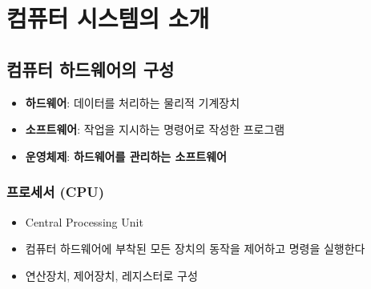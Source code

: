 \section{컴퓨터 시스템의 소개}
\subsection{컴퓨터 하드웨어의 구성}
\begin{itemize}
	\item \textbf{하드웨어}: 데이터를 처리하는 물리적 기계장치
	\item \textbf{소프트웨어}: 작업을 지시하는 명령어로 작성한 프로그램
	\item \textbf{운영체제}: \textbf{하드웨어를 관리하는 소프트웨어}
\end{itemize}

\subsubsection{프로세서 (CPU)}
\begin{itemize}
	\item Central Processing Unit
	\item 컴퓨터 하드웨어에 부착된 모든 장치의 동작을 제어하고 명령을 실행한다
	\item 연산장치, 제어장치, 레지스터로 구성
\end{itemize}

